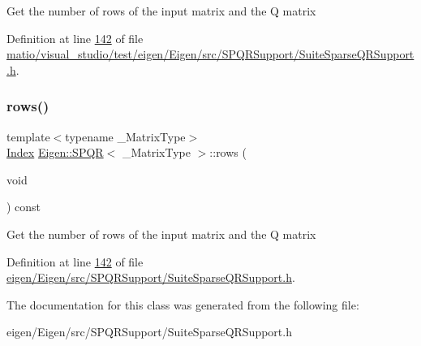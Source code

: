 Get the number of rows of the input matrix and the Q matrix 

Definition at line \hyperlink{matio_2visual__studio_2test_2eigen_2_eigen_2src_2_s_p_q_r_support_2_suite_sparse_q_r_support_8h_source_l00142}{142} of file \hyperlink{matio_2visual__studio_2test_2eigen_2_eigen_2src_2_s_p_q_r_support_2_suite_sparse_q_r_support_8h_source}{matio/visual\+\_\+studio/test/eigen/\+Eigen/src/\+S\+P\+Q\+R\+Support/\+Suite\+Sparse\+Q\+R\+Support.\+h}.

\mbox{\label{class_eigen_1_1_s_p_q_r_a775e28a44fd466638114edbcd17ea50a}} 
\subsubsection{\texorpdfstring{rows()}{rows()}\hspace{0.1cm}{\footnotesize\ttfamily [2/2]}}
{\footnotesize\ttfamily template$<$typename \+\_\+\+Matrix\+Type$>$ \\
\hyperlink{namespace_eigen_a62e77e0933482dafde8fe197d9a2cfde}{Index} \hyperlink{class_eigen_1_1_s_p_q_r}{Eigen\+::\+S\+P\+QR}$<$ \+\_\+\+Matrix\+Type $>$\+::rows (\begin{DoxyParamCaption}\item[{void}]{ }\end{DoxyParamCaption}) const\hspace{0.3cm}{\ttfamily [inline]}}

Get the number of rows of the input matrix and the Q matrix 

Definition at line \hyperlink{eigen_2_eigen_2src_2_s_p_q_r_support_2_suite_sparse_q_r_support_8h_source_l00142}{142} of file \hyperlink{eigen_2_eigen_2src_2_s_p_q_r_support_2_suite_sparse_q_r_support_8h_source}{eigen/\+Eigen/src/\+S\+P\+Q\+R\+Support/\+Suite\+Sparse\+Q\+R\+Support.\+h}.



The documentation for this class was generated from the following file\+:\begin{DoxyCompactItemize}
\item 
eigen/\+Eigen/src/\+S\+P\+Q\+R\+Support/\+Suite\+Sparse\+Q\+R\+Support.\+h\end{DoxyCompactItemize}

